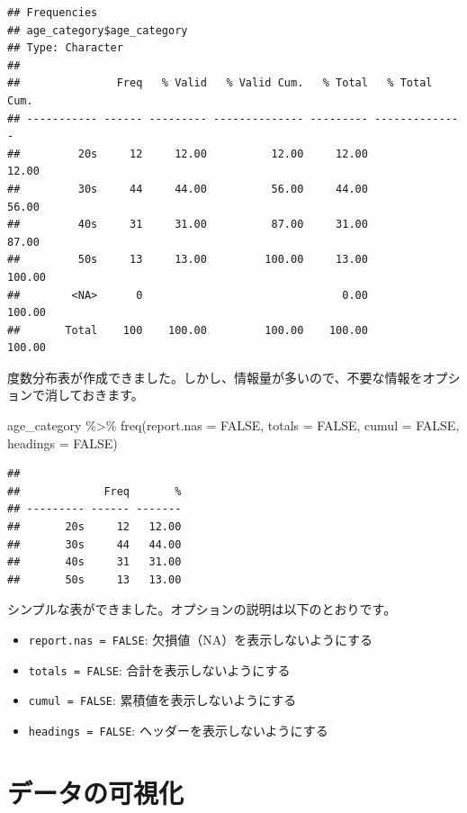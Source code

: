 \documentclass[
]{book}
\newenvironment{Shaded}{\begin{snugshade}}{\end{snugshade}}
\newcommand{\AttributeTok}[1]{\textcolor[rgb]{0.77,0.63,0.00}{#1}}
\newcommand{\ConstantTok}[1]{\textcolor[rgb]{0.00,0.00,0.00}{#1}}
\newcommand{\FunctionTok}[1]{\textcolor[rgb]{0.00,0.00,0.00}{#1}}
\newcommand{\NormalTok}[1]{#1}
\newcommand{\SpecialCharTok}[1]{\textcolor[rgb]{0.00,0.00,0.00}{#1}}
\providecommand{\tightlist}{%
  \setlength{\itemsep}{0pt}\setlength{\parskip}{0pt}}
\begin{document}
\begin{verbatim}
## Frequencies  
## age_category$age_category  
## Type: Character  
## 
##               Freq   % Valid   % Valid Cum.   % Total   % Total Cum.
## ----------- ------ --------- -------------- --------- --------------
##         20s     12     12.00          12.00     12.00          12.00
##         30s     44     44.00          56.00     44.00          56.00
##         40s     31     31.00          87.00     31.00          87.00
##         50s     13     13.00         100.00     13.00         100.00
##        <NA>      0                               0.00         100.00
##       Total    100    100.00         100.00    100.00         100.00
\end{verbatim}

度数分布表が作成できました。しかし、情報量が多いので、不要な情報をオプションで消しておきます。

\begin{Shaded}
\begin{Highlighting}[]
\NormalTok{age\_category }\SpecialCharTok{\%\textgreater{}\%}
  \FunctionTok{freq}\NormalTok{(}\AttributeTok{report.nas =} \ConstantTok{FALSE}\NormalTok{, }\AttributeTok{totals =} \ConstantTok{FALSE}\NormalTok{, }\AttributeTok{cumul =} \ConstantTok{FALSE}\NormalTok{, }\AttributeTok{headings =} \ConstantTok{FALSE}\NormalTok{)}
\end{Highlighting}
\end{Shaded}

\begin{verbatim}
## 
##             Freq       %
## --------- ------ -------
##       20s     12   12.00
##       30s     44   44.00
##       40s     31   31.00
##       50s     13   13.00
\end{verbatim}

シンプルな表ができました。オプションの説明は以下のとおりです。

\begin{itemize}
\tightlist
\item
  \texttt{report.nas\ =\ FALSE}: 欠損値（NA）を表示しないようにする
\item
  \texttt{totals\ =\ FALSE}: 合計を表示しないようにする
\item
  \texttt{cumul\ =\ FALSE}: 累積値を表示しないようにする
\item
  \texttt{headings\ =\ FALSE}: ヘッダーを表示しないようにする
\end{itemize}

\hypertarget{Visualization}{%
\chapter{データの可視化}\label{Visualization}}
\end{document}
